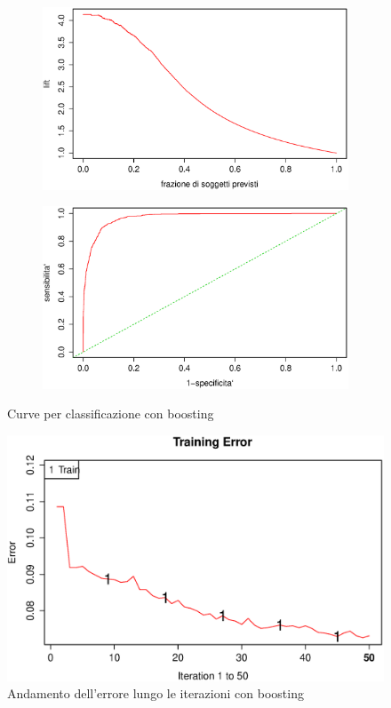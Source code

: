 \begin{figure}[H]
  \begin{subfigure}{0.4\textwidth}
    \includegraphics[width=\columnwidth]{images/class/lift-boosting.eps}
  \end{subfigure}
  \hspace*{\fill}
  \begin{subfigure}{0.4\textwidth}
    \includegraphics[width=\columnwidth]{images/class/roc-boosting.eps}
  \end{subfigure}
  \caption{Curve per classificazione con boosting}
  \label{fig:class-tree}
\end{figure}

\begin{figure}[H]
  \centering
  \includegraphics[width=.5\columnwidth]{images/class/boosting-plot.eps}
  \caption{Andamento dell'errore lungo le iterazioni con boosting}
  \label{fig:final-class-tree}
\end{figure}

